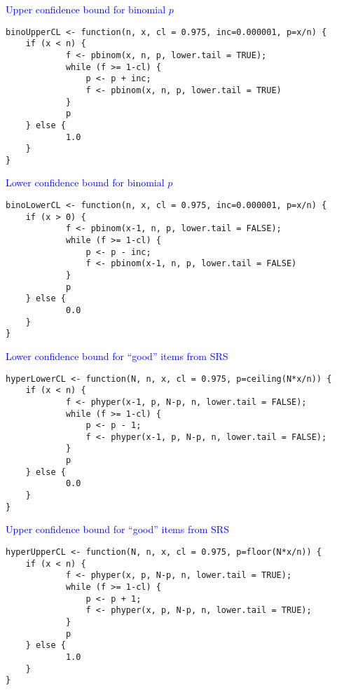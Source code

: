 \documentclass[landscape]{slides}
\begin{document}
\begin{slide}
{\textcolor{blue}{Upper confidence bound for binomial $p$}}

\begin{verbatim}
binoUpperCL <- function(n, x, cl = 0.975, inc=0.000001, p=x/n) {
    if (x < n) {
            f <- pbinom(x, n, p, lower.tail = TRUE);
            while (f >= 1-cl) {
                p <- p + inc;
                f <- pbinom(x, n, p, lower.tail = TRUE)
            }
            p
    } else {
            1.0
    }
}
\end{verbatim}

\end{slide}

\begin{slide}
{\textcolor{blue}{Lower confidence bound for binomial $p$}}
\begin{verbatim}
binoLowerCL <- function(n, x, cl = 0.975, inc=0.000001, p=x/n) {
    if (x > 0) {
            f <- pbinom(x-1, n, p, lower.tail = FALSE);
            while (f >= 1-cl) {
                p <- p - inc;
                f <- pbinom(x-1, n, p, lower.tail = FALSE)
            }
            p
    } else {
            0.0
    }
}
\end{verbatim}

\end{slide}

\begin{slide}
{\textcolor{blue}{Lower confidence bound for ``good'' items from SRS}}

\begin{verbatim}
hyperLowerCL <- function(N, n, x, cl = 0.975, p=ceiling(N*x/n)) {
    if (x < n) {
            f <- phyper(x-1, p, N-p, n, lower.tail = FALSE);
            while (f >= 1-cl) {
                p <- p - 1;
                f <- phyper(x-1, p, N-p, n, lower.tail = FALSE);
            }
            p
    } else {
            0.0
    }
}
\end{verbatim}

\end{slide}

\begin{slide}
{\textcolor{blue}{Upper confidence bound for ``good'' items from SRS}}
\begin{verbatim}
hyperUpperCL <- function(N, n, x, cl = 0.975, p=floor(N*x/n)) {
    if (x < n) {
            f <- phyper(x, p, N-p, n, lower.tail = TRUE);
            while (f >= 1-cl) {
                p <- p + 1;
                f <- phyper(x, p, N-p, n, lower.tail = TRUE);
            }
            p
    } else {
            1.0
    }
}
\end{verbatim}

\end{slide}
\end{document}
